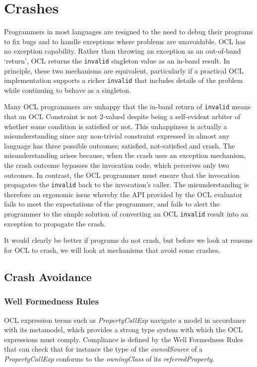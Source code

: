 \documentclass[
]{ceurart}
\begin{document}
\section{Crashes}\label{Crashes}

Programmers in most languages are resigned to the need to debug their programs to fix bugs and to handle exceptions where problems are unavoidable. OCL has no exception capability. Rather than throwing an exception as an out-of-band `return', OCL returns the \verb|invalid| singleton value as an in-band result. In principle, these two mechanisms are equivalent, particularly if a practical OCL implementation supports a richer \verb|invalid| that includes details of the problem while continuing to behave as a singleton.

Many OCL programmers are unhappy that the in-band return of \verb|invalid| means that an OCL Constraint is not 2-valued despite being a self-evident arbiter of whether some condition is satisfied or not. This unhappiness is actually a misunderstanding \cite{OCLreflections} since any non-trivial constraint expressed in almost any language has three possible outcomes; satisfied, not-satisfied and crash. The misunderstanding arises because, when the crash uses an exception mechanism, the crash outcome bypasses the invocation code, which perceives only two outcomes. In contrast, the OCL programmer must ensure that the invocation propagates the \verb|invalid| back to the invocation's caller. The misunderstanding is therefore an ergonomic issue whereby the API provided by the OCL evaluator fails to meet the expectations of the programmer, and fails to alert the programmer to the simple solution of converting an OCL \verb|invalid| result into an exception to propagate the crash.

It would clearly be better if programs do not crash, but before we look at reasons for OCL to crash, we will look at mechanisms that avoid some crashes.

\subsection{Crash Avoidance}

\subsubsection{Well Formedness Rules} OCL expression terms such as \emph{PropertyCallExp} navigate a model in accordance with its metamodel, which provides a strong type system with which the OCL expressions must comply. Compliance is defined by the Well Formedness Rules that can check that for instance the type of the \emph{ownedSource} of a \emph{PropertyCallExp} conforms to the \emph{owningClass} of its \emph{referredProperty}.
\end{document}
